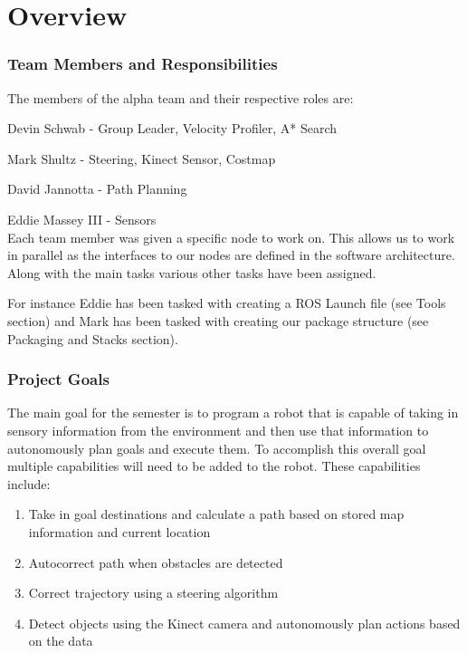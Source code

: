 \part{Overview}

\section{Team Members and Responsibilities}

The members of the alpha team and their respective roles are:

Devin Schwab - Group Leader, Velocity Profiler, A* Search

Mark Shultz - Steering, Kinect Sensor, Costmap

David Jannotta - Path Planning

Eddie Massey III - Sensors\\

Each team member was given a specific node to work on.  This allows us
to work in parallel as the interfaces to our nodes are defined in the
software architecture. Along with the main tasks various other tasks
have been assigned.

For instance Eddie has been tasked with creating a ROS Launch file
(see Tools section) and Mark has been tasked with creating our package
structure (see Packaging and Stacks section).


\section{Project Goals}
The main goal for the semester is to program a robot that is capable
of taking in sensory information from the environment and then use
that information to autonomously plan goals and execute them.  To
accomplish this overall goal multiple capabilities will need to be
added to the robot.  These capabilities include:

\begin{enumerate}
\item Take in goal destinations and calculate a path based on stored
  map information and current location
\item Autocorrect path when obstacles are detected
\item Correct trajectory using a steering algorithm
\item Detect objects using the Kinect camera and autonomously plan
  actions based on the data
\end{enumerate}

